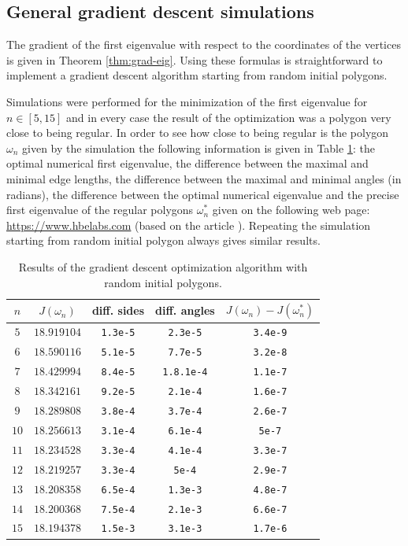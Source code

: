 \subsection{General gradient descent simulations}

The gradient of the first eigenvalue with respect to the coordinates of the vertices is given in Theorem \ref{thm:grad-eig}. Using these formulas is straightforward to implement a gradient descent algorithm starting from random initial polygons.

Simulations were performed for the minimization of the first eigenvalue for $n \in [5,15]$ and in every case the result of the optimization was a polygon very close to being regular. In order to see how close to being regular is the polygon $\omega_n$ given by the simulation the following information is given in Table \ref{tab:result-optim}: the optimal numerical first eigenvalue, the difference between the maximal and minimal edge lengths, the difference between the maximal and minimal angles (in radians), the difference between the optimal numerical eigenvalue and the precise first eigenvalue of the regular polygons $\omega_n^*$ given on the following web page: \url{https://www.hbelabs.com} (based on the article \cite{Jo17}). Repeating the simulation starting from random initial polygon always gives similar results.
\begin{table}[htb]
\smaller
\caption{Results of the gradient descent optimization algorithm with random initial polygons.}
\label{tab:result-optim}
\centering
\begin{tabular}{|c|c|c|c|c|}
\hline
$n$ & $J(\omega_n)$ & diff. sides & diff. angles & $J(\omega_n)-J(\omega_n^*)$ \\ \hline
$5$ & $18.919104$ & \texttt{1.3e-5} & \texttt{2.3e-5} & \texttt{3.4e-9} \\ \hline
$6$ & $18.590116$ & \texttt{5.1e-5} & \texttt{7.7e-5} & \texttt{3.2e-8} \\ \hline
$7$ & $18.429994$ & \texttt{8.4e-5} & \texttt{1.8.1e-4}& \texttt{1.1e-7} \\ \hline
$8$ & $18.342161$ & \texttt{9.2e-5} & \texttt{2.1e-4}& \texttt{1.6e-7} \\ \hline
$9$ & $18.289808$ & \texttt{3.8e-4} & \texttt{3.7e-4} & \texttt{2.6e-7} \\ \hline
$10$ & $18.256613$ & \texttt{3.1e-4} & \texttt{6.1e-4} & \texttt{5e-7} \\ \hline
$11$ & $18.234528$ & \texttt{3.3e-4} & \texttt{4.1e-4} & \texttt{3.3e-7} \\ \hline
$12$ & $18.219257$ & \texttt{3.3e-4} & \texttt{5e-4} & \texttt{2.9e-7} \\ \hline
$13$ & $18.208358$ & \texttt{6.5e-4} & \texttt{1.3e-3} & \texttt{4.8e-7} \\ \hline
$14$ & $18.200368$ & \texttt{7.5e-4} & \texttt{2.1e-3} & \texttt{6.6e-7} \\ \hline
$15$ & $18.194378$ & \texttt{1.5e-3} & \texttt{3.1e-3} & \texttt{1.7e-6} \\ \hline
\end{tabular}
\end{table}
